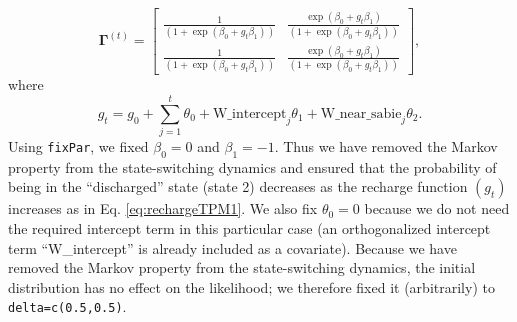 \documentclass[12pt]{article}\usepackage[]{graphicx}\usepackage[]{color}
\begin{document}
\begin{equation*}
  {\mathbf \Gamma^{(t)}} = \begin{bmatrix}
    \frac{1}{(1+\exp(\beta_0+g_t\beta_1))} & \frac{\exp(\beta_0+g_t\beta_1)}{(1+\exp(\beta_0+g_t\beta_1))}  \\
    \frac{1}{(1+\exp(\beta_0+g_t\beta_1))} & \frac{\exp(\beta_0+g_t\beta_1)}{(1+\exp(\beta_0+g_t\beta_1))}   
  \end{bmatrix},
\end{equation*}
where
\begin{equation*}
  g_t = g_0 + \sum_{j=1}^t \theta_0 + \text{W\_intercept}_j \theta_1 + \text{W\_near\_sabie}_j \theta_2.
\end{equation*}
Using \verb|fixPar|, we fixed $\beta_0=0$ and $\beta_1=-1$. Thus we have removed the Markov property from the state-switching dynamics and ensured that the probability of being in the ``discharged'' state (state 2) decreases as the recharge function $(g_t)$ increases as in Eq. \ref{eq:rechargeTPM1}. We also fix $\theta_0=0$ because we do not need the required intercept term in this particular case (an orthogonalized intercept term ``W\_intercept'' is already included as a covariate). Because we have removed the Markov property from the state-switching dynamics, the initial distribution has no effect on the likelihood; we therefore fixed it (arbitrarily) to \verb|delta=c(0.5,0.5)|.
\end{document}

